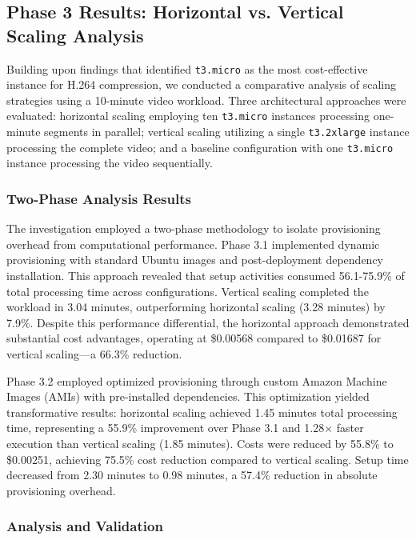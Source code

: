 \documentclass[conference]{IEEEtran}
\begin{document}
	\subsection{Phase 3 Results: Horizontal vs. Vertical Scaling Analysis}
	\label{results-phase3}
	
	Building upon findings that identified \texttt{t3.micro} as the most cost-effective instance for H.264 compression, we conducted a comparative analysis of scaling strategies using a 10-minute video workload. Three architectural approaches were evaluated: horizontal scaling employing ten \texttt{t3.micro} instances processing one-minute segments in parallel; vertical scaling utilizing a single \texttt{t3.2xlarge} instance processing the complete video; and a baseline configuration with one \texttt{t3.micro} instance processing the video sequentially.
	
	\subsubsection{Two-Phase Analysis Results}
	
	The investigation employed a two-phase methodology to isolate provisioning overhead from computational performance. Phase 3.1 implemented dynamic provisioning with standard Ubuntu images and post-deployment dependency installation. This approach revealed that setup activities consumed 56.1-75.9\% of total processing time across configurations. Vertical scaling completed the workload in 3.04 minutes, outperforming horizontal scaling (3.28 minutes) by 7.9\%. Despite this performance differential, the horizontal approach demonstrated substantial cost advantages, operating at \$0.00568 compared to \$0.01687 for vertical scaling—a 66.3\% reduction.
	
	Phase 3.2 employed optimized provisioning through custom Amazon Machine Images (AMIs) with pre-installed dependencies. This optimization yielded transformative results: horizontal scaling achieved 1.45 minutes total processing time, representing a 55.9\% improvement over Phase 3.1 and 1.28× faster execution than vertical scaling (1.85 minutes). Costs were reduced by 55.8\% to \$0.00251, achieving 75.5\% cost reduction compared to vertical scaling. Setup time decreased from 2.30 minutes to 0.98 minutes, a 57.4\% reduction in absolute provisioning overhead.
	
	\subsubsection{Analysis and Validation}
	
\end{document}
